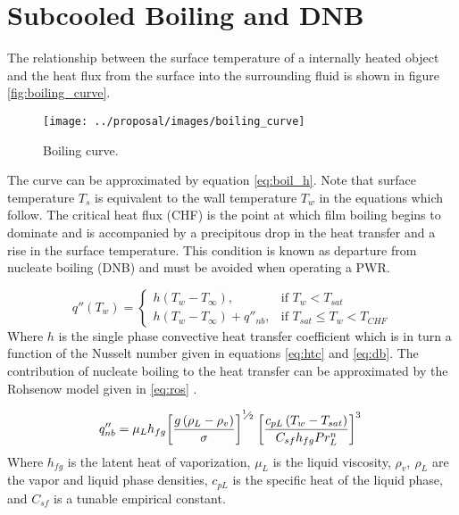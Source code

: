 \section{Subcooled Boiling and DNB}

The relationship between the surface temperature of a internally heated object and the heat flux from the surface into the surrounding fluid is shown in figure \ref{fig:boiling_curve}.

\begin{figure}[H]
    \centering
    \texttt{[image: ../proposal/images/boiling\_curve]}
    \caption{Boiling curve.}
    \label{fig:boilingcurve}
\end{figure}


The curve can be approximated by equation \ref{eq:boil_h}.  Note that surface temperature $T_s$ is equivalent to the wall temperature $T_w$ in the equations which follow.
The critical heat flux (CHF) is the point at which film boiling begins to dominate and is accompanied by a precipitous drop in the heat transfer and a rise in the surface temperature.  This condition is known as departure from nucleate boiling (DNB) and must be avoided when operating a PWR.

\begin{equation}
q''(T_w) = 
\begin{cases}
      h(T_w-T_{\infty}), & \mbox{if } T_w < T_{sat} \\
      h(T_w-T_{\infty}) + q''_{nb} ,  & \mbox{if } T_{sat} \leq T_w < T_{CHF} 
\end{cases}
\label{eq:boil_h}
\end{equation}
Where $h$ is the single phase convective heat transfer coefficient which is in turn a function of the Nusselt number given in equations \ref{eq:htc} and \ref{eq:db}.  The contribution of nucleate boiling to the heat transfer can be approximated by the Rohsenow model given in \ref{eq:ros} \cite{rohsenow51}.

\begin{equation}
q''_{nb} = {{\mu }_{L}}{{h}_{fg}}{{\left[ \frac{g\left( {{\rho }_{L}}-{{\rho }_{v}} \right)}{\sigma } \right]}^{{}^{1}\!\!\diagup\!\!{}_{2}\;}}{{\left[ \frac{{{c}_{pL}}\left( {{T}_{w}}-{{T}_{sat}} \right)}{{{C}_{sf}}{{h}_{fg}}Pr_{L}^{n}} \right]}^{3}\;}
\label{eq:ros}
\end{equation}
Where $h_{fg}$ is the latent heat of vaporization, $\mu_L$ is the liquid viscosity, $\rho_v,\ \rho_L$ are the vapor and liquid phase densities, ${c}_{pL}$ is the specific heat of the liquid phase, and ${C}_{sf}$ is a tunable empirical constant.

